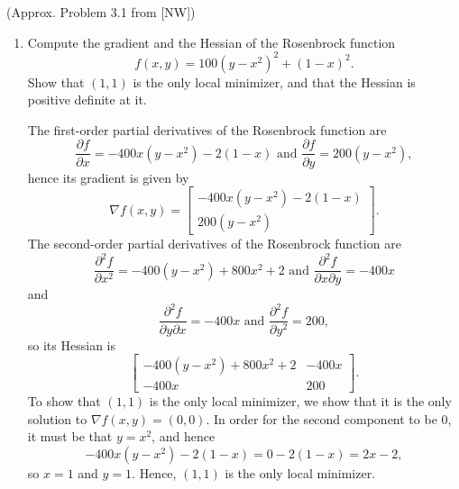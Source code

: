 \documentclass{../kin_math}
\begin{document}
\begin{questions}
  \question (Approx. Problem 3.1 from [NW])
  \begin{enumerate}
    \item Compute the gradient and the Hessian of the Rosenbrock function
    \begin{equation}
      \label{eq:rosenbrock}
      f(x, y) = 100(y - x^2)^2 + (1 - x)^2.
    \end{equation}
    Show that $(1, 1)$ is the only local minimizer, and that the Hessian is positive definite at it.
    \begin{solution}
      The first-order partial derivatives of the Rosenbrock function are
      \begin{equation*}
        \frac{\partial f}{\partial x} = -400x(y - x^2) - 2(1 - x) \text{ and } \frac{\partial f}{\partial y} = 200(y - x^2),
      \end{equation*}
      hence its gradient is given by
      \begin{equation*}
        \nabla f(x, y) = \begin{bmatrix} -400x(y - x^2) - 2(1 - x) \\ 200(y - x^2) \end{bmatrix}.
      \end{equation*}
      The second-order partial derivatives of the Rosenbrock function are
      \begin{equation*}
        \frac{\partial^2 f}{\partial x^2} = -400(y - x^2) + 800x^2 + 2 \text{ and } \frac{\partial^2 f}{\partial x \partial y} = -400x
      \end{equation*}
      and
      \begin{equation*}
        \frac{\partial^2 f}{\partial y \partial x} = -400x \text{ and } \frac{\partial^2 f}{\partial y^2} = 200,
      \end{equation*}
      so its Hessian is
      \begin{equation*}
        \begin{bmatrix}
          -400(y - x^2) + 800x^2 + 2 & -400x \\ -400x & 200
        \end{bmatrix}.
      \end{equation*}
      To show that $(1, 1)$ is the only local minimizer, we show that it is the only solution to $\nabla f(x, y) = (0, 0)$. In order for the second component to be 0, it must be that $y = x^2$, and hence
      \begin{equation*}
        -400x(y - x^2) - 2(1 - x) = 0 - 2(1 - x) = 2x - 2,
      \end{equation*}
      so $x = 1$ and $y = 1$. Hence, $(1, 1)$ is the only local minimizer.


\end{solution}
\end{enumerate}
\end{questions}
\end{document}
